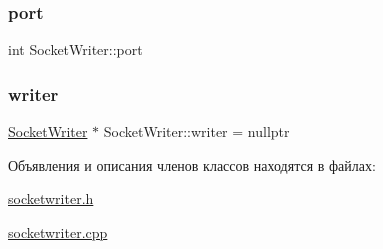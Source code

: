 \subsubsection{\texorpdfstring{port}{port}}
{\footnotesize\ttfamily int Socket\+Writer\+::port}

\mbox{\label{class_socket_writer_adb08a0fb11026b6321905d53eaf3a4cb}} 
\subsubsection{\texorpdfstring{writer}{writer}}
{\footnotesize\ttfamily \hyperlink{class_socket_writer}{Socket\+Writer} $\ast$ Socket\+Writer\+::writer = nullptr\hspace{0.3cm}{\ttfamily [static]}}



Объявления и описания членов классов находятся в файлах\+:\begin{DoxyCompactItemize}
\item 
\hyperlink{socketwriter_8h}{socketwriter.\+h}\item 
\hyperlink{socketwriter_8cpp}{socketwriter.\+cpp}\end{DoxyCompactItemize}
